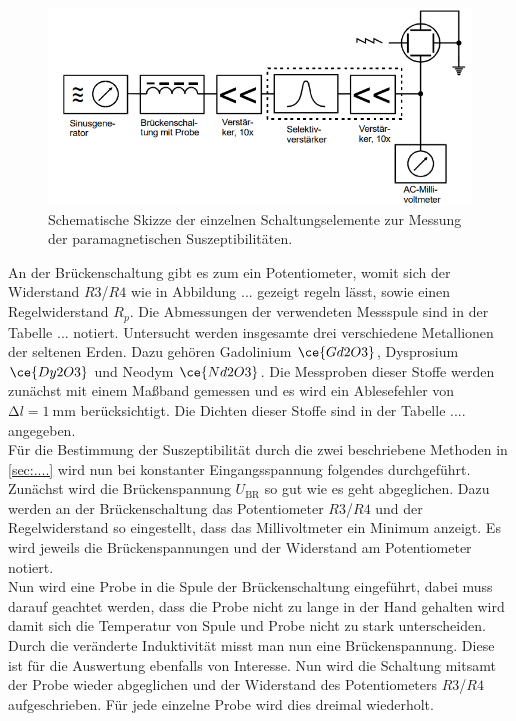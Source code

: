 \begin{figure}
    \centering
    \includegraphics[width=\textwidth]{bilder/aufbaumessung.png}
    \caption{Schematische Skizze der einzelnen Schaltungselemente zur Messung der paramagnetischen Suszeptibilitäten. \cite{skript}} 
    \label{fig:aufbaumessung}
\end{figure}

An der Brückenschaltung gibt es zum ein Potentiometer, womit sich der Widerstand $R3$/$R4$ wie in Abbildung ... gezeigt regeln lässt, sowie einen Regelwiderstand $R_{p}$. Die Abmessungen der verwendeten Messspule sind in der Tabelle ... notiert. 
Untersucht werden insgesamte drei verschiedene Metallionen der seltenen Erden. Dazu gehören Gadolinium $\ce{Gd2O3}$, Dysprosium $\ce{Dy2O3}$ und Neodym $\ce{Nd2O3}$. Die Messproben dieser Stoffe werden zunächst mit einem Maßband gemessen und es wird ein Ablesefehler von
$\increment l= \SI{1}{\milli\meter}$ berücksichtigt. Die Dichten dieser Stoffe sind in der Tabelle .... angegeben.
\\
\newline
Für die Bestimmung der Suszeptibilität durch die zwei beschriebene Methoden in \ref{sec:....} wird nun bei konstanter Eingangsspannung folgendes durchgeführt. 
Zunächst wird die Brückenspannung $U_{\text{BR}}$ so gut wie es geht abgeglichen. Dazu werden an der Brückenschaltung das Potentiometer $R3$/$R4$ und der Regelwiderstand so eingestellt, dass das Millivoltmeter ein Minimum anzeigt. Es wird jeweils die Brückenspannungen und der
Widerstand am Potentiometer notiert. 
\\
Nun wird eine Probe in die Spule der Brückenschaltung eingeführt, dabei muss darauf geachtet werden, dass die Probe nicht zu lange in der Hand gehalten wird damit sich die Temperatur von Spule und Probe nicht zu stark unterscheiden. Durch die 
veränderte Induktivität misst man nun eine Brückenspannung. Diese ist für die Auswertung ebenfalls von Interesse. Nun wird die Schaltung mitsamt der Probe wieder abgeglichen und der Widerstand des Potentiometers $R3$/$R4$ aufgeschrieben. Für
jede einzelne Probe wird dies dreimal wiederholt.
